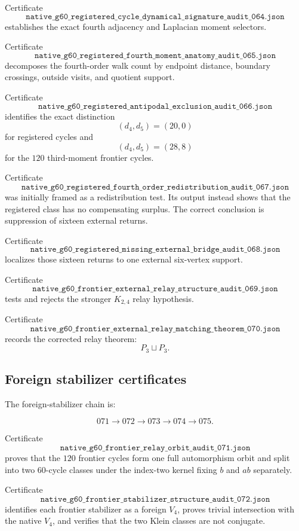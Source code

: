 Certificate
\[
\texttt{native\_g60\_registered\_cycle\_dynamical\_signature\_audit\_064.json}
\]
establishes the exact fourth adjacency and Laplacian moment selectors.

Certificate
\[
\texttt{native\_g60\_registered\_fourth\_moment\_anatomy\_audit\_065.json}
\]
decomposes the fourth-order walk count by endpoint distance, boundary
crossings, outside visits, and quotient support.

Certificate
\[
\texttt{native\_g60\_registered\_antipodal\_exclusion\_audit\_066.json}
\]
identifies the exact distinction
\[
(d_4,d_5)=(20,0)
\]
for registered cycles and
\[
(d_4,d_5)=(28,8)
\]
for the \(120\) third-moment frontier cycles.

Certificate
\[
\texttt{native\_g60\_registered\_fourth\_order\_redistribution\_audit\_067.json}
\]
was initially framed as a redistribution test. Its output instead
shows that the registered class has no compensating surplus. The
correct conclusion is suppression of sixteen external returns.

Certificate
\[
\texttt{native\_g60\_registered\_missing\_external\_bridge\_audit\_068.json}
\]
localizes those sixteen returns to one external six-vertex support.

Certificate
\[
\texttt{native\_g60\_frontier\_external\_relay\_structure\_audit\_069.json}
\]
tests and rejects the stronger \(K_{2,4}\) relay hypothesis.

Certificate
\[
\texttt{native\_g60\_frontier\_external\_relay\_matching\_theorem\_070.json}
\]
records the corrected relay theorem:
\[
P_3\sqcup P_3.
\]

\subsection{Foreign stabilizer certificates}

The foreign-stabilizer chain is:

\[
071
\longrightarrow
072
\longrightarrow
073
\longrightarrow
074
\longrightarrow
075.
\]

Certificate
\[
\texttt{native\_g60\_frontier\_relay\_orbit\_audit\_071.json}
\]
proves that the \(120\) frontier cycles form one full automorphism
orbit and split into two \(60\)-cycle classes under the index-two
kernel fixing \(b\) and \(ab\) separately.

Certificate
\[
\texttt{native\_g60\_frontier\_stabilizer\_structure\_audit\_072.json}
\]
identifies each frontier stabilizer as a foreign \(V_4\), proves
trivial intersection with the native \(V_4\), and verifies that the
two Klein classes are not conjugate.

